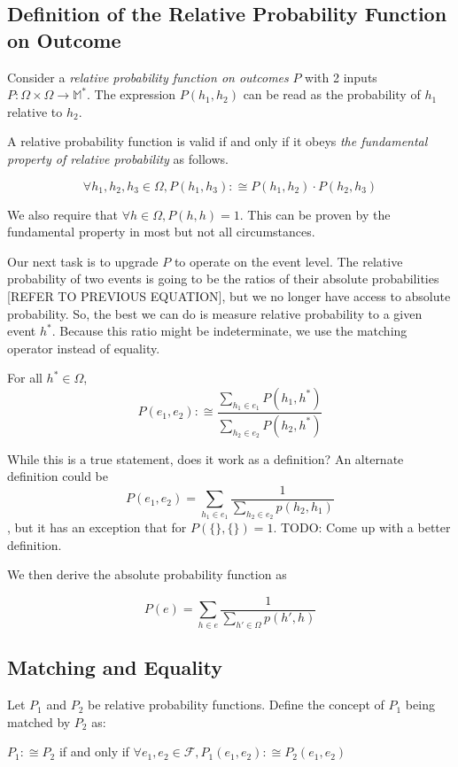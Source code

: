 \documentclass[twoside]{article}
\begin{document}
\subsection{Definition of the Relative Probability Function on Outcome}

Consider a \textit{relative probability function on outcomes} \(P\) with 2 inputs \(P: \Omega \times \Omega \rightarrow \mathbb{M}^*\). The expression \(P(h_1, h_2)\) can be read as the probability of \(h_1\) relative to \(h_2\).

A relative probability function is valid if and only if it obeys \textit{the fundamental property of relative probability} as follows.

\[\forall h_1, h_2, h_3 \in \Omega, P(h_1, h_3) :\cong P(h_1, h_2) \cdot P(h_2, h_3)\]

We also require that \(\forall h \in \Omega, P(h, h) = 1\). This can be proven by the fundamental property in most but not all circumstances.

Our next task is to upgrade \(P\) to operate on the event level. The relative probability of two events is going to be the ratios of their absolute probabilities [REFER TO PREVIOUS EQUATION], but we no longer have access to absolute probability. So, the best we can do is measure relative probability to a given event \(h^*\). Because this ratio might be indeterminate, we use the matching operator instead of equality.

For all \(h^* \in \Omega\), \[P(e_1, e_2) :\cong \frac{\sum_{h_1 \in e_1} P(h_1, h^*)}{\sum_{h_2 \in e_2} P(h_2, h^*)}\]

While this is a true statement, does it work as a definition? An alternate definition could be \[P(e_1, e_2) = \sum_{h_1 \in e_1} \frac{1}{\sum_{h_2 \in e_2} p(h_2, h_1)}\], but it has an exception that for \(P(\{\},\{\}) = 1\). TODO: Come up with a better definition.

We then derive the absolute probability function as

\[P(e) = \sum_{h \in e} \frac{1}{\sum_{h' \in \Omega}p(h', h)}\]

\subsection{Matching and Equality}

Let \(P_1\) and \(P_2\) be relative probability functions. Define the concept of \(P_1\) being matched by \(P_2\) as:

\(P_1 :\cong P_2\) if and only if \(\forall e_1, e_2 \in \mathcal{F}, P_1(e_1, e_2) :\cong P_2(e_1, e_2)\)
\end{document}
